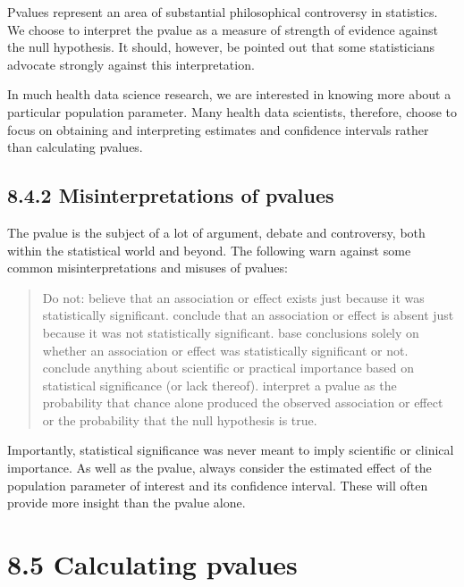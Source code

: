 \documentclass[letterpaper,10pt,english]{jupyterBook}
\begin{document}
\sphinxAtStartPar
P\sphinxhyphen{}values represent an area of substantial philosophical controversy in statistics. We choose to interpret the p\sphinxhyphen{}value as a measure of strength of evidence against the null hypothesis. It should, however, be pointed out that some statisticians advocate strongly against this interpretation.

\sphinxAtStartPar
In much health data science research, we are interested in knowing more about a particular population parameter. Many health data scientists, therefore, choose to focus on obtaining and interpreting estimates and confidence intervals rather than calculating p\sphinxhyphen{}values.


\subsection{8.4.2 Misinterpretations of p\sphinxhyphen{}values}
\label{\detokenize{08.e. Frequentist II:misinterpretations-of-p-values}}
\sphinxAtStartPar
The p\sphinxhyphen{}value is the subject of a lot of argument, debate and controversy, both within the statistical world and beyond. The following warn against some common misinterpretations and mis\sphinxhyphen{}uses of p\sphinxhyphen{}values:
\begin{quote}

\sphinxAtStartPar
Do not:  \sphinxhyphen{} believe that an association or effect exists just because it was statistically significant.
 \sphinxhyphen{} conclude that an association or effect is absent just because it was not statistically significant.
 \sphinxhyphen{} base conclusions solely on whether an association or effect was statistically significant or not.
 \sphinxhyphen{} conclude anything about scientific or practical importance based on statistical significance (or lack thereof).
 \sphinxhyphen{} interpret a p\sphinxhyphen{}value as the probability that chance alone produced the observed association or effect or the probability that the null hypothesis is true.
\end{quote}

\sphinxAtStartPar
Importantly, statistical significance was never meant to imply scientific or clinical importance. As well as the p\sphinxhyphen{}value, always consider the estimated effect of the population parameter of interest and its confidence interval. These will often provide more insight than the p\sphinxhyphen{}value alone.


\section{8.5 Calculating p\sphinxhyphen{}values}
\label{\detokenize{08.f. Frequentist II:calculating-p-values}}\label{\detokenize{08.f. Frequentist II::doc}}
\end{document}

